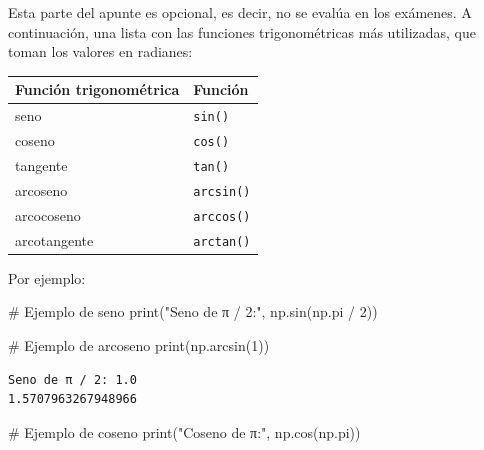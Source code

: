 \documentclass[
  letterpaper,
  DIV=11,
  numbers=noendperiod]{scrreprt}
\newenvironment{Shaded}{\begin{snugshade}}{\end{snugshade}}
\newcommand{\BuiltInTok}[1]{\textcolor[rgb]{0.00,0.23,0.31}{#1}}
\newcommand{\CommentTok}[1]{\textcolor[rgb]{0.37,0.37,0.37}{#1}}
\newcommand{\DecValTok}[1]{\textcolor[rgb]{0.68,0.00,0.00}{#1}}
\newcommand{\NormalTok}[1]{\textcolor[rgb]{0.00,0.23,0.31}{#1}}
\newcommand{\OperatorTok}[1]{\textcolor[rgb]{0.37,0.37,0.37}{#1}}
\newcommand{\StringTok}[1]{\textcolor[rgb]{0.13,0.47,0.30}{#1}}
\begin{document}
\begin{tcolorbox}[enhanced jigsaw, opacitybacktitle=0.6, toptitle=1mm, toprule=.15mm, arc=.35mm, breakable, bottomrule=.15mm, opacityback=0, leftrule=.75mm, rightrule=.15mm, title=\textcolor{quarto-callout-note-color}{\faInfo}\hspace{0.5em}{Funciones trigonométricas (opcional)}, left=2mm, bottomtitle=1mm, colframe=quarto-callout-note-color-frame, colback=white, titlerule=0mm, coltitle=black, colbacktitle=quarto-callout-note-color!10!white]

Esta parte del apunte es opcional, es decir, no se evalúa en los
exámenes. A continuación, una lista con las funciones trigonométricas
más utilizadas, que toman los valores en radianes:

\begin{longtable}[]{@{}ll@{}}
\toprule\noalign{}
Función trigonométrica & Función \\
\midrule\noalign{}
\endhead
\bottomrule\noalign{}
\endlastfoot
seno & \texttt{sin()} \\
coseno & \texttt{cos()} \\
tangente & \texttt{tan()} \\
arcoseno & \texttt{arcsin()} \\
arcocoseno & \texttt{arccos()} \\
arcotangente & \texttt{arctan()} \\
\end{longtable}

Por ejemplo:

\begin{Shaded}
\begin{Highlighting}[]
\CommentTok{\# Ejemplo de seno}
\BuiltInTok{print}\NormalTok{(}\StringTok{"Seno de π / 2:"}\NormalTok{, np.sin(np.pi }\OperatorTok{/} \DecValTok{2}\NormalTok{))}

\CommentTok{\# Ejemplo de arcoseno}
\BuiltInTok{print}\NormalTok{(np.arcsin(}\DecValTok{1}\NormalTok{))}
\end{Highlighting}
\end{Shaded}

\begin{verbatim}
Seno de π / 2: 1.0
1.5707963267948966
\end{verbatim}

\begin{Shaded}
\begin{Highlighting}[]
\CommentTok{\# Ejemplo de coseno}
\BuiltInTok{print}\NormalTok{(}\StringTok{"Coseno de π:"}\NormalTok{, np.cos(np.pi))}


\end{Highlighting}
\end{Shaded}
\end{tcolorbox}
\end{document}
